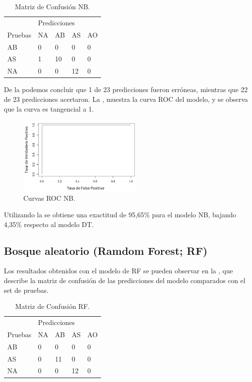 \documentclass[spanish]{textolivre}
\begin{document}
\begin{table}[htpb]
\centering
\caption{Matriz de Confusión NB.}
\label{tab6}
\begin{tabular}{lllll}
\toprule 
  & \multicolumn{4}{l}{Predicciones}   \\ 
\cmidrule{2-5}
Pruebas        & NA      & AB       & AS       & AO
\\ 
\midrule
AB             & 0       & 0        & 0        & 0
\\ 
AS             & 1       & 10       & 0        & 0
\\
NA             & 0       & 0        & 12       & 0
\\
\bottomrule
\end{tabular}
\end{table}

De la  podemos concluir que 1 de 23 predicciones fueron erróneas, mientras que 22 de 23 predicciones acertaron. La , muestra la curva ROC del modelo, y se observa que la curva es tangencial a 1.

\begin{figure}[htbp]
 \centering
 \includegraphics[width=0.55\textwidth]{figura11.png}
 \caption{Curvas ROC NB.}
 \label{figura11}
\end{figure}

Utilizando la  se obtiene una exactitud de 95,65\% para el modelo NB, bajando 4,35\% respecto al modelo DT.

\subsection{Bosque aleatorio (Ramdom Forest; RF)}
Los resultados obtenidos con el modelo de RF  se pueden observar en la , que describe la matriz de confusión de las predicciones del modelo comparados con el set de pruebas.

\begin{table}[htpb]
\centering
\caption{Matriz de Confusión RF.}
\label{tab7}
\begin{tabular}{lllll}
\toprule 
 & \multicolumn{4}{l}{Predicciones}   \\ 
\cmidrule{2-5}
Pruebas        & NA      & AB       & AS       & AO
\\ 
\midrule
AB             & 0       & 0        & 0        & 0
\\ 
AS             & 0       & 11       & 0        & 0
\\
NA             & 0       & 0        & 12       & 0
\\
\bottomrule
\end{tabular}
\end{table}
\end{document}
